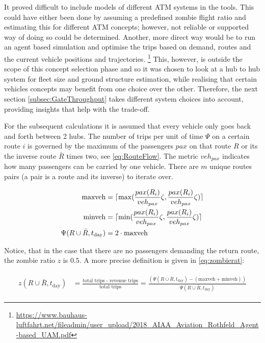It proved difficult to include models of different ATM systems in the tools. This could have either been done by assuming a predefined zombie flight ratio and estimating this for different ATM concepts; however, not reliable or supported way of doing so could be determined. Another, more direct way would be to run an agent based simulation and optimise the trips based on demand, routes and the current vehicle positions and trajectories. \footnote{\url{https://www.bauhaus-luftfahrt.net/fileadmin/user_upload/2018_AIAA_Aviation_Rothfeld_Agent-based_UAM.pdf}} This, however, is outside the scope of this concept selection phase and so it was chosen to look at a hub to hub system for fleet size and ground structure estimation, while realising that certain vehicles concepts may benefit from one choice over the other. Therefore, the next section \ref{subsec:GateThroughput} takes different system choices into account, providing insights that help with the trade-off.

For the subsequent calculations it is assumed that every vehicle only goes back and forth between 2 hubs. The number of trips per unit of time $\Psi$ on a certain route $i$ is governed by the maximum of the passengers $pax$ on that route $R$ or its the inverse route $\bar{R}$ times two, see \autoref{eq:RouteFlow}. The metric $veh_{pax}$ indicates how many passengers can be carried by one vehicle. There are $m$ unique routes pairs (a pair is a route and its inverse) to iterate over.

\begin{align} \label{eq:RouteFlow}
    \text{maxveh} &= \lceil \max( \frac{pax(R_i)}{veh_{pax}} \zeta, \frac{pax(R_i)}{veh_{pax}}\zeta ) \rceil\\
    \text{minveh} &= \lceil \min( \frac{pax(R_i)}{veh_{pax}} \zeta, \frac{pax(R_i)}{veh_{pax}}\zeta ) \rceil\\
    \Psi(R\cup\bar{R}, t_{\text{day}}) &= 2\cdot \text{maxveh}
\end{align}

Notice, that in the case that there are no passengers demanding the return route, the zombie ratio $z$ is $0.5$. A more precise definition is given in \autoref{eq:zombierat}:

\begin{align} \label{eq:zombierat}
\begin{split}
    z(R\cup\bar{R}, t_{\text{day}}) &= \frac{\text{total trips - revenue trips}}{\text{total trips}} = \frac{(\Psi(R\cup\bar{R}, t_{\text{day}}) - (\text{maxveh} + \text{minveh}))}{\Psi(R\cup\bar{R}, t_{\text{day}})}
\end{split}
\end{align}


